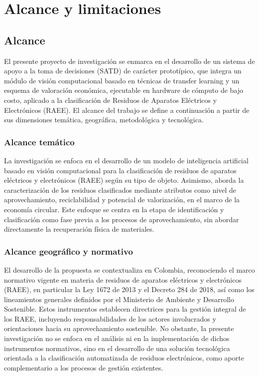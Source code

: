 \chapter{Alcance y limitaciones}

\section{Alcance}

El presente proyecto de investigación se enmarca en el desarrollo de un sistema de apoyo a la toma de decisiones (SATD) de carácter prototípico, que integra un módulo de visión computacional basado en técnicas de transfer learning y un esquema de valoración económica, ejecutable en hardware de cómputo de bajo costo, aplicado a la clasificación de Residuos de Aparatos Eléctricos y Electrónicos (RAEE). El alcance del trabajo se define a continuación a partir de sus dimensiones temática, geográfica, metodológica y tecnológica.

\subsection{Alcance temático}
La investigación se enfoca en el desarrollo de un modelo de inteligencia artificial basado en visión computacional para la clasificación de residuos de aparatos eléctricos y electrónicos (RAEE) según su tipo de objeto. Asimismo, aborda la caracterización de los residuos clasificados mediante atributos como nivel de aprovechamiento, reciclabilidad y potencial de valorización, en el marco de la economía circular. Este enfoque se centra en la etapa de identificación y clasificación como fase previa a los procesos de aprovechamiento, sin abordar directamente la recuperación física de materiales.

\subsection{Alcance geográfico y normativo}
El desarrollo de la propuesta se contextualiza en Colombia, reconociendo el marco normativo vigente en materia de residuos de aparatos eléctricos y electrónicos (RAEE), en particular la Ley 1672 de 2013 y el Decreto 284 de 2018, así como los lineamientos generales definidos por el Ministerio de Ambiente y Desarrollo Sostenible. Estos instrumentos establecen directrices para la gestión integral de los RAEE, incluyendo responsabilidades de los actores involucrados y orientaciones hacia su aprovechamiento sostenible. No obstante, la presente investigación no se enfoca en el análisis ni en la implementación de dichos instrumentos normativos, sino en el desarrollo de una solución tecnológica orientada a la clasificación automatizada de residuos electrónicos, como aporte complementario a los procesos de gestión existentes.

